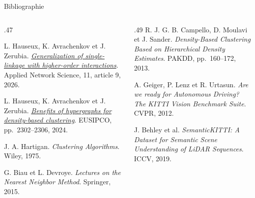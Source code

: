 \documentclass[10pt,aspectratio=169]{beamer}
\begin{document}
\begin{frame}{Bibliographie}
\begingroup
\fontsize{8}{10}\selectfont\color{gris_fonce_inria}
\setlength{\parskip}{.20cm}
\begin{columns}[t,onlytextwidth]
\begin{column}{.47\textwidth}
{\color{inriared}\hypersetup{urlcolor=inriared}
L. Hauseux, K. Avrachenkov et J. Zerubia.
\href{https://doi.org/10.1007/s41109-025-00756-1}{\emph{Generalization of single-linkage with higher-order interactions}}.
Applied Network Science, 11, article 9, 2026.\par

L. Hauseux, K. Avrachenkov et J. Zerubia.
\href{https://doi.org/10.23919/EUSIPCO63174.2024.10715271}{\emph{Benefits of hypergraphs for density-based clustering}}.
EUSIPCO, pp.~2302--2306, 2024.\par
}
\vspace{.10cm}
J. A. Hartigan.
\emph{Clustering Algorithms}.
Wiley, 1975.\par

G. Biau et L. Devroye.
\emph{Lectures on the Nearest Neighbor Method}.
Springer, 2015.\par
\end{column}
\begin{column}{.49\textwidth}
R. J. G. B. Campello, D. Moulavi et J. Sander.
\emph{Density-Based Clustering Based on Hierarchical Density Estimates}.
PAKDD, pp.~160--172, 2013.\par

A. Geiger, P. Lenz et R. Urtasun.
\emph{Are we ready for Autonomous Driving? The KITTI Vision Benchmark Suite}.
CVPR, 2012.\par

J. Behley et al.
\emph{SemanticKITTI: A Dataset for Semantic Scene Understanding of LiDAR Sequences}.
ICCV, 2019.\par
\end{column}
\end{columns}
\endgroup
\end{frame}
\end{document}
